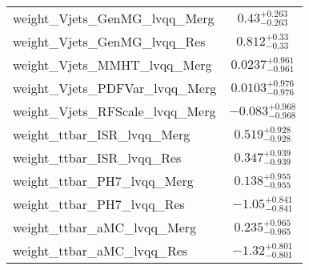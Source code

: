 \begin{tabular}{|l|c|}
weight\_Vjets\_GenMG\_lvqq\_Merg & $0.43^{+0.263}_{-0.263}$ \\
weight\_Vjets\_GenMG\_lvqq\_Res & $0.812^{+0.33}_{-0.33}$ \\
weight\_Vjets\_MMHT\_lvqq\_Merg & $0.0237^{+0.961}_{-0.961}$ \\
weight\_Vjets\_PDFVar\_lvqq\_Merg & $0.0103^{+0.976}_{-0.976}$ \\
weight\_Vjets\_RFScale\_lvqq\_Merg & $-0.083^{+0.968}_{-0.968}$ \\
weight\_ttbar\_ISR\_lvqq\_Merg & $0.519^{+0.928}_{-0.928}$ \\
weight\_ttbar\_ISR\_lvqq\_Res & $0.347^{+0.939}_{-0.939}$ \\
weight\_ttbar\_PH7\_lvqq\_Merg & $0.138^{+0.955}_{-0.955}$ \\
weight\_ttbar\_PH7\_lvqq\_Res & $-1.05^{+0.841}_{-0.841}$ \\
weight\_ttbar\_aMC\_lvqq\_Merg & $0.235^{+0.965}_{-0.965}$ \\
weight\_ttbar\_aMC\_lvqq\_Res & $-1.32^{+0.801}_{-0.801}$ \\
\hline
\end{tabular}
